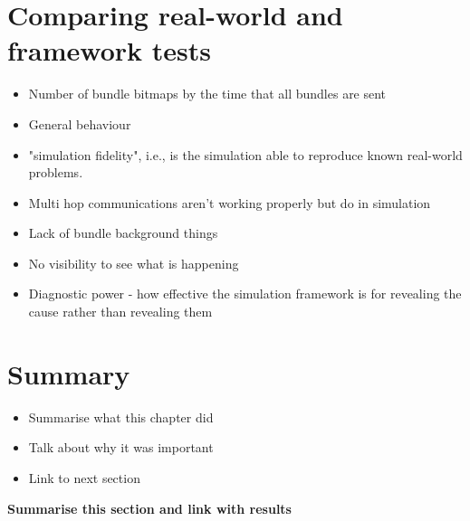 \section{Comparing real-world and framework tests}
\begin{itemize}
    \item Number of bundle bitmaps by the time that all bundles are sent
    \item General behaviour
    \item "simulation fidelity", i.e., is the simulation able to reproduce known real-world problems.
    \item Multi hop communications aren't working properly but do in simulation
    \item Lack of bundle background things
    \item No visibility to see what is happening
    \item Diagnostic power - how effective the simulation framework is for revealing the cause rather than revealing them 
\end{itemize}




\section{Summary}
\begin{itemize}
    \item Summarise what this chapter did
    \item Talk about why it was important
    \item Link to next section
\end{itemize}
\textbf{Summarise this section and link with results}